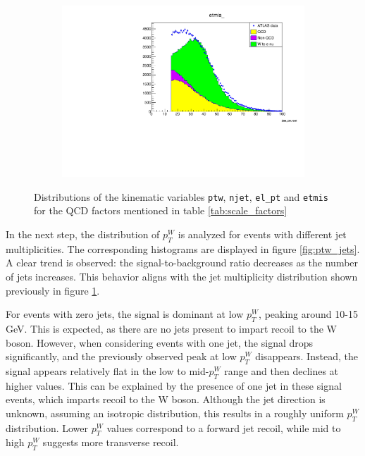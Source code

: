 \begin{figure}[H]
\begin{subfigure}{0.5\textwidth}
        \end{subfigure}
        \begin{subfigure}{0.5\textwidth}
            \includegraphics[width=\textwidth]{../W_mass/etmis_100_0_100_qcd0-3.pdf}
        \end{subfigure}
        \caption{Distributions of the kinematic variables \texttt{ptw}, \texttt{njet}, \texttt{el\_pt} and \texttt{etmis} for the QCD factors mentioned in table \ref{tab:scale_factors}}
        \label{fig:qcd-final}
    \end{figure}
    In the next step, the distribution of $p_T^W$ is analyzed for events with different jet multiplicities. The corresponding histograms are displayed in figure \ref{fig:ptw_jets}.
    A clear trend is observed: the signal-to-background ratio decreases as the number of jets increases.
    This behavior aligns with the jet multiplicity distribution shown previously in figure \ref{fig:qcd-final}.

    For events with zero jets, the signal is dominant at low $p_T^W$, peaking around 10-15\,GeV. This is expected, as there are no jets present to impart recoil to the W boson.
    However, when considering events with one jet, the signal drops significantly, and the previously observed peak at low $p_T^W$ disappears.
    Instead, the signal appears relatively flat in the low to mid-$p_T^W$ range and then declines at higher values.
    This can be explained by the presence of one jet in these signal events, which imparts recoil to the W boson.
    Although the jet direction is unknown, assuming an isotropic distribution, this results in a roughly uniform $p_T^W$ distribution.
    Lower $p_T^W$ values correspond to a forward jet recoil, while mid to high $p_T^W$ suggests more transverse recoil.

